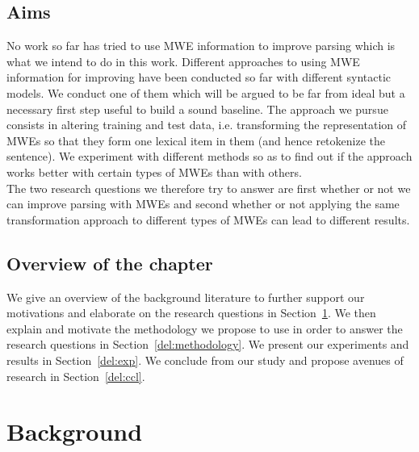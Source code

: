 \documentclass[output=paper]{langsci/langscibook}
\begin{document}
\subsection{Aims}
\indent No work so far has tried to use MWE information to improve  parsing which is what we intend to do in this work. Different approaches to using MWE information for improving  have been conducted so far with different syntactic models. We conduct one of them which will be argued to be far from ideal but a necessary first step useful to build a sound baseline. The approach we pursue consists in altering training and test data, i.e. transforming the representation of MWEs so that they form one lexical item in them (and hence retokenize the sentence). We experiment with different  methods so as to find out if the approach works better with certain types of MWEs than with others.\\
\indent The two research questions we therefore try to answer are first whether or not we can improve  parsing with MWEs and second whether or not applying the same transformation approach to different types of MWEs can lead to different results.

\subsection{Overview of the chapter}
\indent We give an overview of the background literature to further support our motivations and elaborate on the research questions in Section~\ref{del:relatedwork}. We then explain and motivate the methodology we propose to use in order to answer the research questions in Section~\ref{del:methodology}. We present our experiments and results in Section~\ref{del:exp}. We conclude from our study and propose avenues of research in Section~\ref{del:ccl}.


\section{Background}
\label{del:relatedwork}
\end{document}
